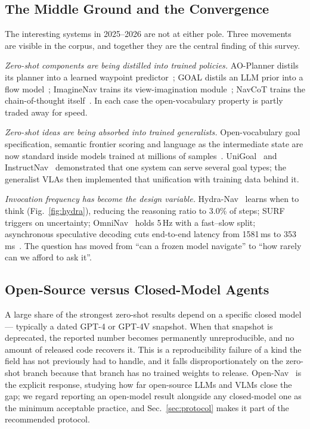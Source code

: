 \documentclass[journal]{IEEEtran}
\begin{document}
\subsection{The Middle Ground and the Convergence}\label{sec:middle}
The interesting systems in 2025--2026 are not at either pole. Three
movements are visible in the corpus, and together they are the central
finding of this survey.

\emph{Zero-shot components are being distilled into trained policies.}
AO-Planner distils its planner into a learned waypoint
predictor~\cite{chen2024affordances}; GOAL distils an LLM prior into a flow
model~\cite{li2025distilling}; ImagineNav trains its view-imagination
module~\cite{zhao2024imaginenav}; NavCoT trains the chain-of-thought
itself~\cite{lin2025navcot}. In each case the open-vocabulary property is
partly traded away for speed.

\emph{Zero-shot ideas are being absorbed into trained generalists.}
Open-vocabulary goal specification, semantic frontier scoring and language
as the intermediate state are now standard inside models trained at
millions of samples~\cite{zhang2025embodied,chu2026abot,gao2025octonav}.
UniGoal~\cite{yin2025unigoal} and InstructNav~\cite{long2024instructnav}
demonstrated that one system can serve several goal types; the generalist
VLAs then implemented that unification with training data behind it.

\emph{Invocation frequency has become the design variable.}
Hydra-Nav~\cite{wang2026hydra} learns when to think (Fig.~\ref{fig:hydra}),
reducing the reasoning ratio to 3.0\% of steps; SURF~\cite{shinnick2026surf} triggers on
uncertainty; OmniNav~\cite{xue2025omninav} holds 5\,Hz with a fast--slow
split; asynchronous speculative decoding cuts end-to-end latency from
1581\,ms to 353\,ms~\cite{feng2026asynchronous}. The question has moved from
``can a frozen model navigate'' to ``how rarely can we afford to ask it''.

\subsection{Open-Source versus Closed-Model Agents}
A large share of the strongest zero-shot results depend on a specific
closed model --- typically a dated GPT-4 or GPT-4V snapshot. When that
snapshot is deprecated, the reported number becomes permanently
unreproducible, and no amount of released code recovers it. This is a
reproducibility failure of a kind the field has not previously had to
handle, and it falls disproportionately on the zero-shot branch because
that branch has no trained weights to release.
Open-Nav~\cite{qiao2025open} is the explicit response, studying how far
open-source LLMs and VLMs close the gap; we regard reporting an
open-model result alongside any closed-model one as the minimum acceptable
practice, and Sec.~\ref{sec:protocol} makes it part of the recommended
protocol.
\end{document}

